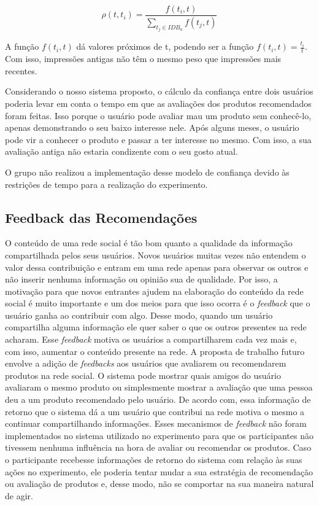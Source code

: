 \begin{equation}
 \rho(t,t_i) = \frac{f(t_i,t)}{{\sum_{t_j\in{IDB_a}}}f(t_j,t)}
 \label{eq:rho_t} 
\end{equation}

 A função $f(t_i,t)$ dá valores próximos de t, podendo ser a função $f(t_i,t) = \frac{t_i}{t}$. Com isso, impressões antigas não têm o mesmo peso que impressões mais recentes.

 Considerando o nosso sistema proposto, o cálculo da confiança entre dois usuários poderia levar em conta o tempo em que as avaliações dos produtos recomendados foram feitas. Isso porque o usuário pode avaliar mau um produto sem conhecê-lo, apenas demonstrando o seu baixo interesse nele. Após alguns meses, o usuário pode vir a conhecer o produto e passar a ter interesse no mesmo. Com isso, a sua avaliação antiga não estaria condizente com o seu gosto atual.
 
 O grupo não realizou a implementação desse modelo de confiança devido às restrições de tempo para a realização do experimento.


\subsection{Feedback das Recomendações} %
\label{sub:feedback_das_recomendacoes}

 O conteúdo de uma rede social é tão bom quanto a qualidade da informação compartilhada pelos seus usuários. Novos usuários muitas vezes não entendem o valor dessa contribuição e entram em uma rede apenas para observar os outros e não inserir nenhuma informação ou opinião sua de qualidade. Por isso, a motivação para que novos entrantes ajudem na elaboração do conteúdo da rede social é muito importante e um dos meios para que isso ocorra é o \textit{feedback} que o usuário ganha ao contribuir com algo\cite{burke2009fmm}.
 Desse modo, quando um usuário compartilha alguma informação ele quer saber o que os outros presentes na rede acharam. Esse \textit{feedback} motiva os usuários a compartilharem cada vez mais e, com isso, aumentar o conteúdo presente na rede.
 A proposta de trabalho futuro envolve a adição de \textit{feedbacks} aos usuários que avaliarem ou recomendarem produtos na rede social. O sistema pode mostrar quais amigos do usuário avaliaram o mesmo produto ou simplesmente mostrar a avaliação que uma pessoa deu a um produto recomendado pelo usuário. De acordo com\cite{burke2009fmm}, essa informação de retorno que o sistema dá a um usuário que contribui na rede motiva o mesmo a continuar compartilhando informações.
 Esses mecanismos de \textit{feedback} não foram implementados no sistema utilizado no experimento para que os participantes não tivessem nenhuma influência na hora de avaliar ou recomendar os produtos. Caso o participante recebesse informações de retorno do sistema com relação às suas ações no experimento, ele poderia tentar mudar a sua estratégia de recomendação ou avaliação de produtos e, desse modo, não se comportar na sua maneira natural de agir.

